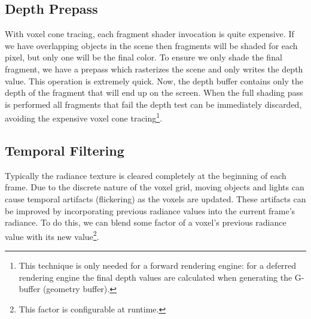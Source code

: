 \subsection{Depth Prepass}
With voxel cone tracing, each fragment shader invocation is quite expensive. If we have overlapping objects in the scene then fragments will be shaded for each pixel, but only one will be the final color. To ensure we only shade the final fragment, we have a prepass which rasterizes the scene and only writes the depth value. This operation is extremely quick. Now, the depth buffer contains only the depth of the fragment that will end up on the screen. When the full shading pass is performed all fragments that fail the depth test can be immediately discarded, avoiding the expensive voxel cone tracing\footnote{This technique is only needed for a forward rendering engine: for a deferred rendering engine the final depth values are calculated when generating the G-buffer (geometry buffer).}.


\subsection{Temporal Filtering}     %
Typically the radiance texture is cleared completely at the beginning of each frame. Due to the discrete nature of the voxel grid, moving objects and lights can cause temporal artifacts (flickering) as the voxels are updated. These artifacts can be improved by incorporating previous radiance values into the current frame's radiance. To do this, we can blend some factor of a voxel's previous radiance value with its new value\footnote{This factor is configurable at runtime.}.



